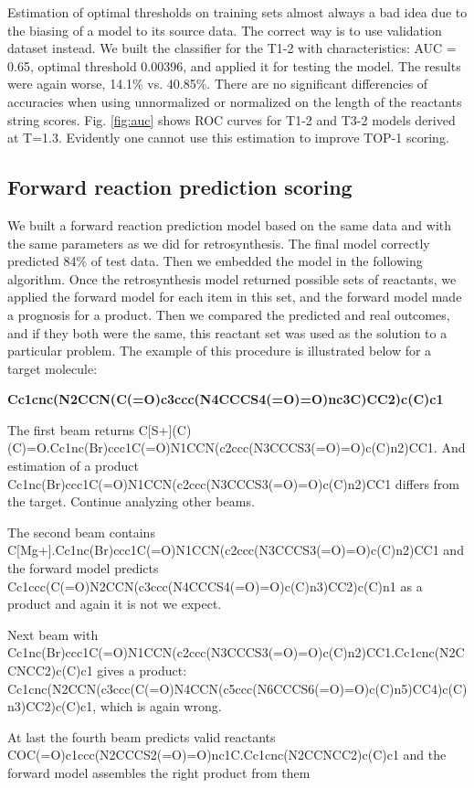 \documentclass{article}
\begin{document}
 
Estimation of optimal thresholds on training sets almost always a bad idea due to the biasing of a model to its source data. The correct way is to use validation dataset instead. We built the classifier for the T1-2 with characteristics: AUC = 0.65, optimal threshold 0.00396, and applied it for testing the model. The results were again worse, 14.1\% vs. 40.85\%. There are no significant differencies of accuracies when using unnormalized or normalized on the length of the reactants string scores. Fig. \ref{fig:auc} shows ROC curves for T1-2 and T3-2 models derived at T=1.3. 
Evidently one cannot use this estimation to improve TOP-1 scoring.

\subsection{Forward reaction prediction scoring}

We built a forward reaction prediction model based on the same data and with the same parameters as we did for retrosynthesis. The final model correctly predicted 84\% of test data. Then we embedded the model in the following algorithm. Once the retrosynthesis model returned possible sets of reactants, we applied the forward model for each item in this set, and the forward model made a prognosis for a product. Then we compared the predicted and real outcomes, and if they both were the same, this reactant set was used as the solution to a particular problem. The example of this procedure is illustrated below for a target molecule: 


\noindent\textbf{Cc1cnc(N2CCN(C(=O)c3ccc(N4CCCS4(=O)=O)nc3C)CC2)c(C)c1}

The first beam returns  C[S+](C)(C)=O.Cc1nc(Br)ccc1C(=O)N1CCN(c2ccc(N3CCCS3(=O)=O)c(C)n2)CC1.
And estimation of a product Cc1nc(Br)ccc1C(=O)N1CCN(c2ccc(N3CCCS3(=O)=O)c(C)n2)CC1 differs from the target. Continue analyzing other beams.

The second beam contains C[Mg+].Cc1nc(Br)ccc1C(=O)N1CCN(c2ccc(N3CCCS3(=O)=O)c(C)n2)CC1 and the forward model predicts   Cc1ccc(C(=O)N2CCN(c3ccc(N4CCCS4(=O)=O)c(C)n3)CC2)c(C)n1 as a product and again it is not we expect.

Next beam with Cc1nc(Br)ccc1C(=O)N1CCN(c2ccc(N3CCCS3(=O)=O)c(C)n2)CC1.Cc1cnc(N2CCNCC2)c(C)c1  gives a product: Cc1cnc(N2CCN(c3ccc(C(=O)N4CCN(c5ccc(N6CCCS6(=O)=O)c(C)n5)CC4)c(C)n3)CC2)c(C)c1, which is again wrong.

At last the fourth beam predicts valid reactants COC(=O)c1ccc(N2CCCS2(=O)=O)nc1C.Cc1cnc(N2CCNCC2)c(C)c1 and the forward model  assembles the right product from them 
\end{document}

